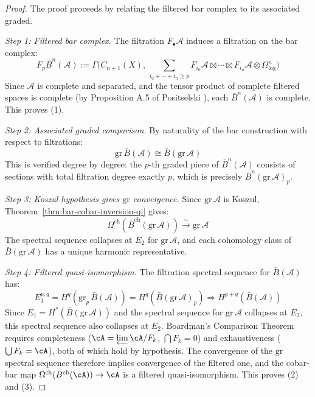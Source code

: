 \begin{proof}
The proof proceeds by relating the filtered bar complex to its associated graded.

\emph{Step 1: Filtered bar complex.}
The filtration $F_\bullet \mathcal{A}$ induces a filtration on the bar complex:
\[F_p \bar{B}^n(\mathcal{A}) := \Gamma\bigl(\overline{C}_{n+1}(X),\,
\textstyle\sum_{i_0 + \cdots + i_n \geq p}
F_{i_0}\mathcal{A} \boxtimes \cdots \boxtimes F_{i_n}\mathcal{A}
\otimes \Omega^n_{\log}\bigr)\]
Since $\mathcal{A}$ is complete and separated, and the tensor product of
complete filtered spaces is complete (by Proposition A.5 of Positselski
\cite{Positselski11}), each $\bar{B}^n(\mathcal{A})$ is complete.
This proves (1).

\emph{Step 2: Associated graded comparison.}
By naturality of the bar construction with respect to filtrations:
\[\mathrm{gr}\,\bar{B}(\mathcal{A}) \cong \bar{B}(\mathrm{gr}\,\mathcal{A})\]
This is verified degree by degree: the $p$-th graded piece of $\bar{B}^n(\mathcal{A})$
consists of sections with total filtration degree exactly $p$, which is precisely
$\bar{B}^n(\mathrm{gr}\,\mathcal{A})_p$.

\emph{Step 3: Koszul hypothesis gives $\mathrm{gr}$ convergence.}
Since $\mathrm{gr}\,\mathcal{A}$ is Koszul, Theorem~\ref{thm:bar-cobar-inversion-qi} gives:
\[\Omega^{\mathrm{ch}}(\bar{B}^{\mathrm{ch}}(\mathrm{gr}\,\mathcal{A}))
\xrightarrow{\sim} \mathrm{gr}\,\mathcal{A}\]
The spectral sequence collapses at $E_2$ for $\mathrm{gr}\,\mathcal{A}$, and
each cohomology class of $\bar{B}(\mathrm{gr}\,\mathcal{A})$ has a unique harmonic
representative.

\emph{Step 4: Filtered quasi-isomorphism.}
The filtration spectral sequence for $\bar{B}(\mathcal{A})$ has:
\[E_1^{p,q} = H^q(\mathrm{gr}_p\,\bar{B}(\mathcal{A})) =
H^q(\bar{B}(\mathrm{gr}\,\mathcal{A})_p) \Longrightarrow
H^{p+q}(\bar{B}(\mathcal{A}))\]
Since $E_1 = H^*(\bar{B}(\mathrm{gr}\,\mathcal{A}))$ and the spectral sequence for
$\mathrm{gr}\,\mathcal{A}$ collapses at $E_2$, this spectral sequence also collapses
at $E_2$.  Boardman's Comparison Theorem \cite{Boardman-conditional}
requires completeness ($\cA = \varprojlim \cA/F_k$, $\bigcap F_k = 0$)
and exhaustiveness ($\bigcup F_k = \cA$), both of which hold by
hypothesis.  The convergence of the $\mathrm{gr}$ spectral sequence
therefore implies convergence of the filtered one, and the cobar-bar
map $\Omega^{\mathrm{ch}}(\bar{B}^{\mathrm{ch}}(\cA)) \to \cA$ is a
filtered quasi-isomorphism.  This proves (2) and (3).


\end{proof}
